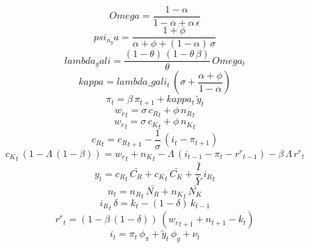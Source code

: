\documentclass[10pt,a4paper]{article}
\begin{document}
\footnotesize
\begin{dmath*}
Omega = \frac{1-{\alpha}}{1-{\alpha}+{\alpha}\, {\epsilon}}
\end{dmath*}
\begin{dmath*}
psi_n_ya = \frac{1+{\phi}}{{\alpha}+{\phi}+\left(1-{\alpha}\right)\, {\sigma}}
\end{dmath*}
\begin{dmath*}
lambda_gali = \frac{\left(1-{\theta}\right)\, \left(1-{\theta}\, {\beta}\right)}{{\theta}}\, Omega_{t}
\end{dmath*}
\begin{dmath*}
kappa = lambda\_gali_{t}\, \left({\sigma}+\frac{{\alpha}+{\phi}}{1-{\alpha}}\right)
\end{dmath*}
\begin{dmath}
{\pi}_{t}={\beta}\, {\pi}_{t+1}+kappa_{t}\, {\tilde y}_{t}
\end{dmath}
\begin{dmath}
{w_r}_{t}={\sigma}\, {c_R}_{t}+{\phi}\, {n_R}_{t}
\end{dmath}
\begin{dmath}
{w_r}_{t}={\sigma}\, {c_K}_{t}+{\phi}\, {n_K}_{t}
\end{dmath}
\begin{dmath}
{c_R}_{t}={c_R}_{t+1}-\frac{1}{{\sigma}}\, \left({i}_{t}-{\pi}_{t+1}\right)
\end{dmath}
\begin{dmath}
{c_K}_{t}\, \left(1-{\Lambda}\, \left(1-{\beta}\right)\right)={w_r}_{t}+{n_K}_{t}-{\Lambda}\, \left({i}_{t-1}-{\pi}_{t}-{r^r}_{t-1}\right)-{\beta}\, {\Lambda}\, {r^r}_{t}
\end{dmath}
\begin{dmath}
{y}_{t}={c_R}_{t}\, \bar{C_R}+{c_K}_{t}\, \bar{C_K}+{\frac{\bar{I}}{\bar{Y}}}\, {i_R}_{t}
\end{dmath}
\begin{dmath}
{n}_{t}={n_R}_{t}\, \bar{N_R}+{n_K}_{t}\, \bar{N_K}
\end{dmath}
\begin{dmath}
{i_R}_{t}\, {\delta}={k}_{t}-\left(1-{\delta}\right)\, {k}_{t-1}
\end{dmath}
\begin{dmath}
{r^r}_{t}=\left(1-{\beta}\, \left(1-{\delta}\right)\right)\, \left({w_r}_{t+1}+{n}_{t+1}-{k}_{t}\right)
\end{dmath}
\begin{dmath}
{i}_{t}={\pi}_{t}\, {\phi_{\pi}}+{\tilde y}_{t}\, {\phi_{y}}+{\nu}_{t}
\end{dmath}
\end{document}
